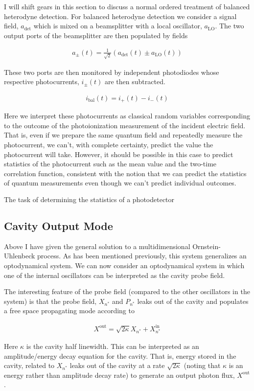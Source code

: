 \documentclass[12pt]{article}
\begin{document}
I will shift gears in this section to discuss a normal ordered treatment of balanced heterodyne detection. For balanced heterodyne detection we consider a signal field, $a_{\text{det}}$ which is mixed on a beamsplitter with a local oscillator, $a_{\text{LO}}$. The two output ports of the beamsplitter are then populated by fields

\begin{align}
a_{\pm}(t) = \frac{1}{\sqrt{2}}(a_{\text{det}}(t) \pm a_{\text{LO}}(t))
\end{align}

These two ports are then monitored by independent photodiodes whose respective photocurrents, $i_{\pm}(t)$ are then subtracted.

\begin{align}
i_{\text{bal}}(t) = i_+(t) - i_-(t)
\end{align}

Here we interpret these photocurrents as classical random variables corresponding to the outcome of the photoionization measurement of the incident electric field. That is, even if we prepare the same quantum field and repeatedly measure the photocurrent, we can't, with complete certainty, predict the value the photocurrent will take. However, it should be possible in this case to predict statistics of the photocurrent such as the mean value and the two-time correlation function, consistent with the notion that we can predict the statistics of quantum measurements even though we can't predict individual outcomes.

The task of determining the statistics of a photodetector 




\subsection{Cavity Output Mode}

Above I have given the general solution to a multidimensional Ornstein-Uhlenbeck process. As has been mentioned previously, this system generalizes an optodynamical system. We can now consider an optodynamical system in which one of the internal oscillators can be interpreted as the cavity probe field.

The interesting feature of the probe field (compared to the other oscillators in the system) is that the probe field, $X_{n^*}$ and $P_{n^*}$ leaks out of the cavity and populates a free space propagating mode according to

\begin{align}
X^{\text{out}} = \sqrt{2\kappa} X_{n^*} + X_{n^*}^{\text{in}}
\end{align}

Here $\kappa$ is the cavity half linewidth. This can be interpreted as an amplitude/energy decay equation for the cavity. That is, energy stored in the cavity, related to $X_{n^*}$ leaks out of the cavity at a rate $\sqrt{2\kappa}$ (noting that $\kappa$ is an energy rather than amplitude decay rate) to generate an output photon flux, $X^{\text{out}}$.
\end{document}

